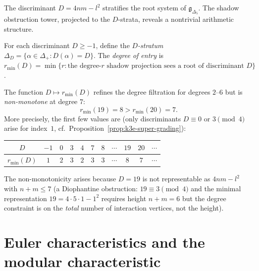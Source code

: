 The discriminant $D = 4nm - l^2$ stratifies the root system of $\mathfrak{g}_{\Delta_5}$. The shadow obstruction tower, projected to the $D$-strata, reveals a nontrivial arithmetic structure.

\begin{definition}
\label{def:k3e-d-stratification}
For each discriminant $D \geq -1$, define the \emph{$D$-stratum} $\Delta_D = \{\alpha \in \Delta_+ : D(\alpha) = D\}$. The \emph{degree of entry} is $r_{\min}(D) = \min\{r : \text{the degree-}r\text{ shadow projection sees a root of discriminant } D\}$.
\end{definition}

\begin{proposition}
\label{prop:k3e-non-monotone}
The function $D \mapsto r_{\min}(D)$ refines the degree filtration for degrees $2$--$6$ but is \emph{non-monotone} at degree $7$:
\[
 r_{\min}(19) = 8 > r_{\min}(20) = 7.
\]
More precisely, the first few values are (only discriminants $D \equiv 0$ or $3 \pmod{4}$ arise for index~$1$, cf.\ Proposition~\ref{prop:k3e-super-grading}):
\begin{center}
\begin{tabular}{c|cccccccccc}
$D$ & $-1$ & $0$ & $3$ & $4$ & $7$ & $8$ & $\cdots$ & $19$ & $20$ & $\cdots$ \\ \hline
$r_{\min}(D)$ & $1$ & $2$ & $3$ & $2$ & $3$ & $3$ & $\cdots$ & $8$ & $7$ & $\cdots$
\end{tabular}
\end{center}
The non-monotonicity arises because $D = 19$ is not representable as $4nm - l^2$ with $n + m \leq 7$ (a Diophantine obstruction: $19 \equiv 3 \pmod{4}$ and the minimal representation $19 = 4 \cdot 5 \cdot 1 - 1^2$ requires height $n + m = 6$ but the degree constraint is on the \emph{total} number of interaction vertices, not the height).
\end{proposition}

\section{Euler characteristics and the modular characteristic}
\label{sec:k3e-euler-kappa}

